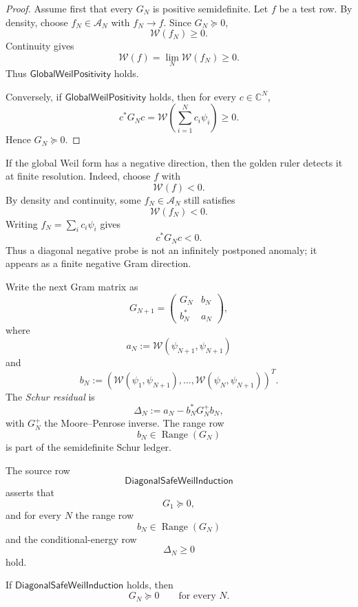 \begin{proof}
Assume first that every $G_N$ is positive semidefinite.  Let
$f$ be a test row.  By density, choose $f_N\in\mathcal A_N$ with
$f_N\to f$.  Since $G_N\succeq0$,
$$
\mathcal W(f_N)\ge0.
$$
Continuity gives
$$
\mathcal W(f)=\lim_N\mathcal W(f_N)\ge0.
$$
Thus $\mathsf{GlobalWeilPositivity}$ holds.

Conversely, if $\mathsf{GlobalWeilPositivity}$ holds, then for every
$c\in\mathbb C^N$,
$$
c^\ast G_Nc
=
\mathcal W\left(\sum_{i=1}^N c_i\psi_i\right)
\ge0.
$$
Hence $G_N\succeq0$.
\end{proof}

\begin{principle}
\label{prin:rh-finite-diagonal-witness}
If the global Weil form has a negative direction, then the golden ruler
detects it at finite resolution.  Indeed, choose $f$ with
$$
\mathcal W(f)<0.
$$
By density and continuity, some $f_N\in\mathcal A_N$ still satisfies
$$
\mathcal W(f_N)<0.
$$
Writing $f_N=\sum_i c_i\psi_i$ gives
$$
c^\ast G_Nc<0.
$$
Thus a diagonal negative probe is not an infinitely postponed anomaly;
it appears as a finite negative Gram direction.
\end{principle}

\begin{definition}
\label{def:rh-schur-residual-golden-weil-tower}
Write the next Gram matrix as
$$
G_{N+1}
=
\begin{pmatrix}
G_N & b_N\\
b_N^\ast & a_N
\end{pmatrix},
$$
where
$$
a_N:=\mathcal W(\psi_{N+1},\psi_{N+1})
$$
and
$$
b_N:=
\left(
\mathcal W(\psi_1,\psi_{N+1}),
\ldots,
\mathcal W(\psi_N,\psi_{N+1})
\right)^T.
$$
The \emph{Schur residual} is
$$
\Delta_N:=a_N-b_N^\ast G_N^+b_N,
$$
with $G_N^+$ the Moore--Penrose inverse.  The range row
$$
b_N\in\operatorname{Range}(G_N)
$$
is part of the semidefinite Schur ledger.
\end{definition}

\begin{definition}
\label{def:rh-diagonal-safe-weil-induction}
The source row
$$
\mathsf{DiagonalSafeWeilInduction}
$$
asserts that
$$
G_1\succeq0,
$$
and for every $N$ the range row
$$
b_N\in\operatorname{Range}(G_N)
$$
and the conditional-energy row
$$
\Delta_N\ge0
$$
hold.
\end{definition}

\begin{theorem}
\label{thm:rh-schur-induction-gives-finite-gram-positivity}
If $\mathsf{DiagonalSafeWeilInduction}$ holds, then
$$
G_N\succeq0
\qquad
\text{for every }N.
$$
\end{theorem}

